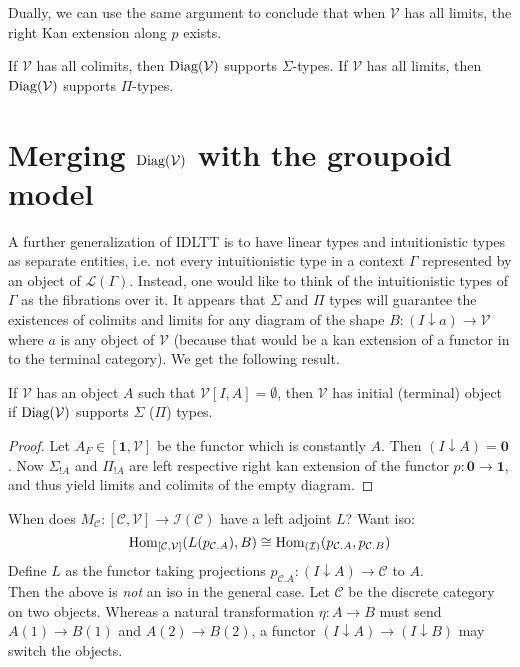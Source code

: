 Dually, we can use the same argument to conclude that when $\mathcal{V}$ has all limits, the right Kan extension along $p$ exists.
\begin{cor}
If $\mathcal{V}$ has all colimits, then $\operatorname{\text{Diag}}(\mathcal{V})$ supports $\Sigma$-types. If $\mathcal{V}$ has all limits, then $\operatorname{\text{Diag}}(\mathcal{V})$ supports $\Pi$-types.
\end{cor}
\newpage
\section{Merging $\operatorname{\text{Diag}}(\mathcal{V})$ with the groupoid model}
A further generalization of IDLTT is to have linear types and intuitionistic types as separate entities, i.e. not every intuitionistic type in a context $\Gamma$ represented by an object of $\mathcal{L}(\Gamma)$. Instead, one would like to think of the intuitionistic types of $\Gamma$ as the fibrations over it. 
\newpage
It appears that $\Sigma$ and $\Pi$ types will guarantee the existences of colimits and limits for any diagram of the shape $B : (I \downarrow a) \to \mathcal{V}$ where $a$ is any object of $\mathcal{V}$ (because that would be a kan extension of a functor in to the terminal category). We get the following result.
\begin{thm}
If $\mathcal{V}$ has an object $A$ such that $\mathcal{V}[I, A] = \emptyset$, then $\mathcal{V}$ has initial (terminal) object if $\operatorname{\text{Diag}}(\mathcal{V})$ supports $\Sigma$ ($\Pi$) types.
\begin{proof}
Let $A_F \in [\mathbf{1}, \mathcal{V}]$ be the functor which is constantly $A$. Then $(I \downarrow A) = \mathbf{0}$. Now $\Sigma_{!A}$ and $\Pi_{!A}$ are left respective right kan extension of the functor $p : \mathbf{0} \to \mathbf{1}$, and thus yield limits and colimits of the empty diagram.
\end{proof}
\end{thm}

When does $M_{\mathcal{C}} : [\mathcal{C}, \mathcal{V}] \to \mathcal{I}(\mathcal{C})$ have a left adjoint $L$? Want iso:
\[
\operatorname{\text{Hom}}_{[\mathcal{C}, \mathcal{V}]}(L(p_{\mathcal{C}.A}), B) \cong \operatorname{\text{Hom}}_{(\mathcal{I})}(p_{\mathcal{C}.A}, p_{\mathcal{C}.B})
\]
Define $L$ as the functor taking projections $p_{\mathcal{C}.A} : (I \downarrow A) \to \mathcal{C}$ to $A$.\\
Then the above is \textit{not} an iso in the general case. Let $\mathcal{C}$ be the discrete category on two objects. Whereas a natural transformation $\eta : A \to B$ must send $A(1) \to B(1)$ and $A(2) \to B(2)$, a functor $(I \downarrow A) \to (I \downarrow B)$ may switch the objects.

